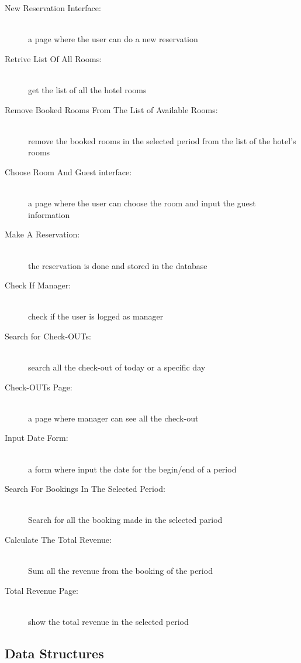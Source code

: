 \begin{description}
    \item[New Reservation Interface:] \hfill \\
      a page where the user can do a new reservation
    \item[Retrive List Of All Rooms:] \hfill \\
      get the list of all the hotel rooms
    \item[Remove Booked Rooms From The List of Available Rooms:] \hfill \\
      remove the booked rooms in the selected period from the list of the hotel’s rooms
    \item[Choose Room And Guest interface:] \hfill \\
      a page where the user can choose the room and input the guest information
    \item[Make A Reservation:] \hfill \\
      the reservation is done and stored in the database

    \item[Check If Manager:] \hfill \\
      check if the user is logged as manager
    \item[Search for Check-OUTs:] \hfill \\
      search all the check-out of today or a specific day
    \item[Check-OUTs Page:] \hfill \\
      a page where manager can see all the check-out
    \item[Input Date Form:] \hfill \\
      a form  where input the date for the begin/end of a period
    \item[Search For Bookings In The Selected Period:] \hfill \\
      Search for all the booking made in the selected pariod
    \item[Calculate The Total Revenue:] \hfill \\
      Sum all the revenue from the booking of the period
    \item[Total Revenue Page:] \hfill \\
      show the total revenue in the selected period

\end{description}

\subsection{Data Structures}
  
